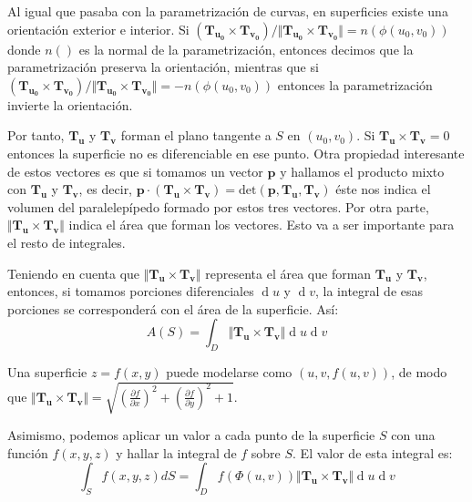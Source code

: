 \documentclass[a4paper]{article}
\renewcommand{\d}[1]{\ensuremath{\operatorname{d}\!{#1}}}
\begin{document}
Al igual que pasaba con la parametrización de curvas, en superficies existe una orientación exterior e interior. Si $(\textbf{T}_{\textbf{u}_\textbf{0}} \times \textbf{T}_{\textbf{v}_\textbf{0}})/\Vert \textbf{T}_{\textbf{u}_\textbf{0}} \times \textbf{T}_{\textbf{v}_\textbf{0}} \Vert =  n(\phi(u_0,v_0))$ donde $n()$ es la normal de la parametrización, entonces decimos que la parametrización preserva la orientación, mientras que si  $(\textbf{T}_{\textbf{u}_\textbf{0}} \times \textbf{T}_{\textbf{v}_\textbf{0}})/\Vert \textbf{T}_{\textbf{u}_\textbf{0}} \times \textbf{T}_{\textbf{v}_\textbf{0}}\Vert =  -n(\phi(u_0,v_0))$ entonces la parametrización invierte la orientación.

Por tanto, $\textbf{T}_\textbf{u}$ y $\textbf{T}_\textbf{v}$ forman el plano tangente a $S$ en $(u_0, v_0)$. Si $\textbf{T}_\textbf{u} \times \textbf{T}_\textbf{v} = 0$ entonces la superficie no es diferenciable en ese punto. Otra propiedad interesante de estos vectores es que si tomamos un vector $\textbf{p}$ y hallamos el producto mixto con $\textbf{T}_\textbf{u}$ y $\textbf{T}_\textbf{v}$, es decir, $\textbf{p}\cdot(\textbf{T}_\textbf{u}\times \textbf{T}_\textbf{v}) = \text{det}(\textbf{p}, \textbf{T}_\textbf{u}, \textbf{T}_\textbf{v})$ éste nos indica el volumen del paralelepípedo formado por estos tres vectores. Por otra parte, $\Vert \textbf{T}_\textbf{u}\times \textbf{T}_\textbf{v}\Vert$ indica el área que forman los vectores. Esto va a ser importante para el resto de integrales.


Teniendo en cuenta que $\Vert \textbf{T}_\textbf{u}\times \textbf{T}_\textbf{v}\Vert$ representa el área que forman $\textbf{T}_\textbf{u}$ y $\textbf{T}_\textbf{v}$, entonces, si tomamos porciones diferenciales $\d{u}$ y $\d{v}$, la integral de esas porciones se corresponderá con el área de la superficie. Así:
\[ A(S) = \int_D \Vert \textbf{T}_\textbf{u}\times \textbf{T}_\textbf{v} \Vert \d{u}\d{v}\]

Una superficie $z = f(x,y)$ puede modelarse como $(u,v,f(u,v))$, de modo que $\Vert \textbf{T}_\textbf{u}\times \textbf{T}_\textbf{v}\Vert = \sqrt{\left(\frac{\partial f}{\partial x}\right)^2 + \left(\frac{\partial f}{\partial y}\right)^2 + 1 }$.

Asimismo, podemos aplicar un valor a cada punto de la superficie $S$ con una función $f(x,y,z)$ y hallar la integral de $f$ sobre $S$. El valor de esta integral es:
\[\int_S f(x,y,z) dS = \int_D f(\Phi(u,v)) \Vert \textbf{T}_\textbf{u}\times \textbf{T}_\textbf{v} \Vert \d{u}\d{v} \]
\end{document}
